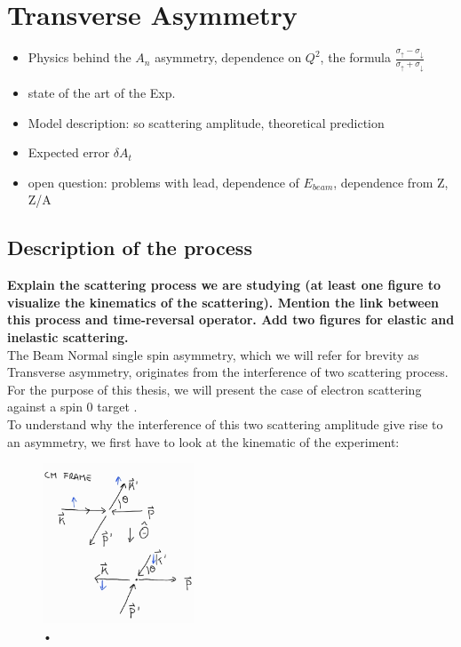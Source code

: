 
\chapter{Transverse Asymmetry} \label{transv}

\begin{itemize}

\item Physics behind the $A_{n}$ asymmetry, dependence on $Q^{2}$, the formula $\frac{\sigma_{\uparrow} - \sigma_{\downarrow}}{\sigma_{\uparrow} + \sigma_{\downarrow}}$
\item state of the art of the Exp.
\item Model description: so scattering amplitude, theoretical prediction
\item Expected error $ \delta A_{t} $
\item open question: problems with lead, dependence of $E_{beam}$, dependence from Z, Z/A
\end{itemize}

\section{Description of the process}

{\bfseries Explain the scattering process we are studying (at least one figure to visualize the kinematics of the scattering). Mention the link between this process and time-reversal operator. Add two figures for elastic and inelastic scattering.} \\

The Beam Normal single spin asymmetry, which we will refer for brevity as Transverse asymmetry, originates from the interference of two scattering process. For the purpose of this thesis, we will present the case of electron scattering against a spin $0$ target \cite{Gorchtein_2008}.\\

To understand why the interference of this two scattering amplitude give rise to an asymmetry, we first have to look at the kinematic of the experiment: 

\begin{figure}[hbtp]
\centering
\includegraphics[width = 0.4\textwidth]{figures/Kinematic.jpg}
\caption{•}
\end{figure}

